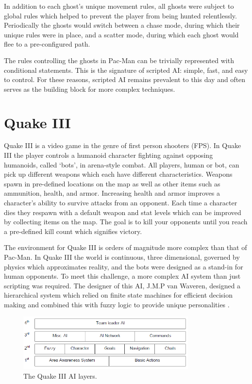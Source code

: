 In addition to each ghost's unique movement rules, all ghosts were subject to global rules which helped to prevent the player from being hunted relentlessly. Periodically the ghosts would switch between a chase mode, during which their unique rules were in place, and a scatter mode, during which each ghost would flee to a pre-configured path.

The rules controlling the ghosts in Pac-Man can be trivially represented with conditional statements. This is the signature of scripted AI: simple, fast, and easy to control. For these reasons, scripted AI remains prevalent to this day and often serves as the building block for more complex techniques.

\section{Quake III}
\label{chap:games:quake}

Quake III is a video game in the genre of first person shooters (FPS). In Quake III the player controls a humanoid character fighting against opposing humanoids, called `bots', in arena-style combat. All players, human or bot, can pick up different weapons which each have different characteristics. Weapons spawn in pre-defined locations on the map as well as other items such as ammunition, health, and armor. Increasing health and armor improves a character's ability to survive attacks from an opponent. Each time a character dies they respawn with a default weapon and stat levels which can be improved by collecting items on the map. The goal is to kill your opponents until you reach a pre-defined kill count which signifies victory. 

The environment for Quake III is orders of magnitude more complex than that of Pac-Man. In Quake III the world is continuous, three dimensional, governed by physics which approximates reality, and the bots were designed as a stand-in for human opponents. To meet this challenge, a more complex AI system than just scripting was required. The designer of this AI, J.M.P van Waveren, designed a hierarchical system which relied on finite state machines for efficient decision making and combined this with fuzzy logic to provide unique personalities \cite{q3bot}.

\begin{figure}
	\centering
		\includegraphics[width=0.80\textwidth]{q3_layers.png}
	\caption{The Quake III AI layers. \cite{q3bot}}
	\label{fig:q3:layers}
\end{figure}

